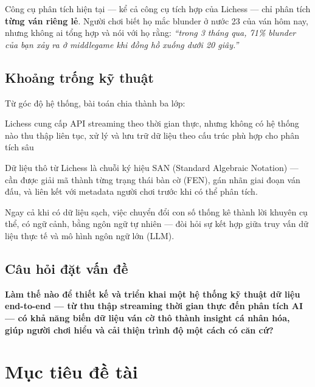 \documentclass[14pt,a4paper]{extarticle}
\begin{document}
Công cụ phân tích hiện tại --- kể cả công cụ tích hợp của Lichess --- chỉ phân
tích \textbf{từng ván riêng lẻ}. Người chơi biết họ mắc blunder ở nước 23 của
ván hôm nay, nhưng không ai tổng hợp và nói với họ rằng: \textit{``trong 3
tháng qua, 71\% blunder của bạn xảy ra ở middlegame khi đồng hồ xuống dưới 20
giây.''}

\subsection{Khoảng trống kỹ thuật}

Từ góc độ hệ thống, bài toán chia thành ba lớp:

\begin{description}[leftmargin=2cm, style=nextline]
  \item[\textbf{Lớp thu thập.}]
    Lichess cung cấp API streaming theo thời gian thực, nhưng không có hệ
    thống nào thu thập liên tục, xử lý và lưu trữ dữ liệu theo cấu trúc phù
    hợp cho phân tích sâu

  \item[\textbf{Lớp xử lý.}]
    Dữ liệu thô từ Lichess là chuỗi ký hiệu SAN (Standard Algebraic
    Notation) --- cần được giải mã thành từng trạng thái bàn cờ (FEN), gán
    nhãn giai đoạn ván đấu, và liên kết với metadata người chơi trước khi có
    thể phân tích.

  \item[\textbf{Lớp trí tuệ.}]
    Ngay cả khi có dữ liệu sạch, việc chuyển đổi con số thống kê thành lời
    khuyên cụ thể, có ngữ cảnh, bằng ngôn ngữ tự nhiên --- đòi hỏi sự kết hợp
    giữa truy vấn dữ liệu thực tế và mô hình ngôn ngữ lớn (LLM).
\end{description}

\subsection{Câu hỏi đặt vấn đề}

\begin{highlightbox}
\textbf{Làm thế nào để thiết kế và triển khai một hệ thống kỹ thuật dữ liệu
end-to-end --- từ thu thập streaming thời gian thực đến phân tích AI --- có khả
năng biến dữ liệu ván cờ thô thành insight cá nhân hóa, giúp người chơi hiểu
và cải thiện trình độ một cách có căn cứ?}
\end{highlightbox}

\section{Mục tiêu đề tài}
\end{document}

